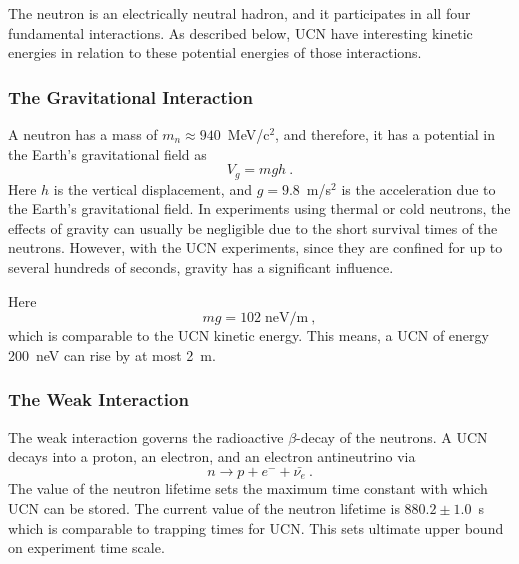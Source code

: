 
The neutron is an electrically neutral hadron, and it participates in
all four fundamental interactions. As described below, UCN have
interesting kinetic energies in relation to these potential energies
of those interactions.


\subsubsection{The Gravitational Interaction}
A neutron has a mass of $m_n\approx 940$~MeV/c$^2$, and therefore, it has a
potential in the Earth's gravitational field as
\begin{equation}
V_g=mgh~.
\end{equation}
Here $h$ is the vertical displacement, and $g=9.8$~m/s$^2$ is the
acceleration due to the Earth's gravitational field.  In experiments
using thermal or cold neutrons, the effects of gravity can usually be
negligible due to the short survival times of the neutrons. However,
with the UCN experiments, since they are confined for up to several
hundreds of seconds, gravity has a significant influence.

Here
\begin{equation}
mg=102\; \text{neV/m}~,
\end{equation}
which is comparable to the UCN kinetic energy. This means, a UCN of
energy 200~neV can rise by at most 2~m.

\subsubsection{The Weak Interaction}
The weak interaction governs the radioactive $\beta$-decay of the
neutrons. A UCN decays into a proton, an electron, and an electron
antineutrino via
\label{neutrondecay}
\begin{equation}
n\longrightarrow p+e^{-}+\bar{\nu_{e}}~.
\end{equation}
The value of the neutron lifetime sets the maximum time constant with
which UCN can be stored. The current value of the neutron lifetime is
$880.2 \pm 1.0$~s~\cite{PDG2018} which is comparable to trapping times
for UCN. This sets ultimate upper bound on experiment time scale.

